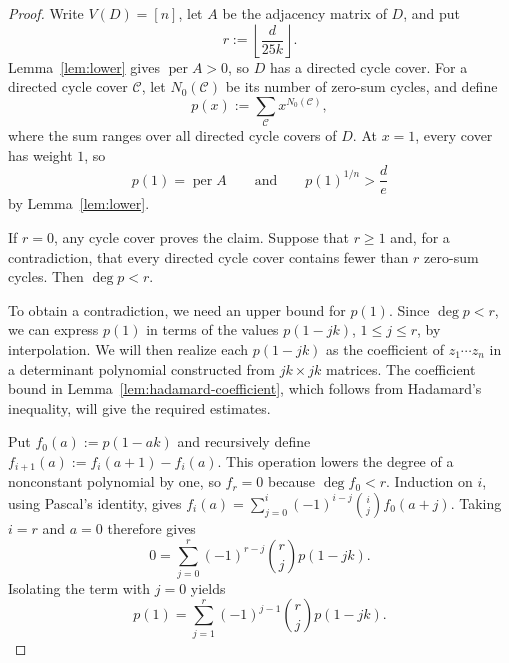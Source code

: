 \documentclass[11pt]{amsart}
\theoremstyle{remark}
\newcommand{\per}{\operatorname{per}}
\begin{document}
\begin{proof}
Write $V(D)=[n]$, let $A$ be the adjacency matrix of $D$, and put
\[
  r:=\left\lfloor\frac{d}{25k}\right\rfloor.
\]
Lemma~\ref{lem:lower} gives $\per A>0$, so $D$ has a directed cycle
cover.
For a directed cycle cover $\mathcal C$, let $N_0(\mathcal C)$ be its
number of zero-sum cycles, and define
\[
  p(x):=\sum_{\mathcal C}x^{N_0(\mathcal C)},
\]
where the sum ranges over all directed cycle covers of $D$.  At
$x=1$, every cover has weight $1$, so
\[
  p(1)=\per A
  \qquad\text{and}\qquad
  p(1)^{1/n}>\frac de
\]
by Lemma~\ref{lem:lower}.

If $r=0$, any cycle cover proves the claim.  Suppose that $r\ge1$ and,
for a contradiction, that every directed cycle cover contains fewer
than $r$ zero-sum cycles.  Then $\deg p<r$.

To obtain a contradiction, we need an upper bound for $p(1)$.  Since
$\deg p<r$, we can express $p(1)$ in terms of the values $p(1-jk)$,
$1\le j\le r$, by interpolation.  We will then realize each
$p(1-jk)$ as the coefficient of $z_1\cdots z_n$ in a determinant
polynomial constructed from $jk\times jk$ matrices.  The coefficient
bound in Lemma~\ref{lem:hadamard-coefficient}, which follows from
Hadamard's inequality, will give the required estimates.

Put $f_0(a):=p(1-ak)$ and recursively define
$f_{i+1}(a):=f_i(a+1)-f_i(a)$.  This operation lowers the degree of a
nonconstant polynomial by one, so $f_r=0$ because $\deg f_0<r$.
Induction on $i$, using Pascal's identity, gives
$f_i(a)=\sum_{j=0}^i(-1)^{i-j}\binom ij f_0(a+j)$.  Taking $i=r$ and
$a=0$ therefore gives
\[
  0=
  \sum_{j=0}^r(-1)^{r-j}\binom rj p(1-jk).
\]
Isolating the term with $j=0$ yields
\begin{equation}\label{eq:cover-finite-difference}
  p(1)
  =
  \sum_{j=1}^r(-1)^{j-1}\binom rj p(1-jk).
\end{equation}


\end{proof}
\end{document}

